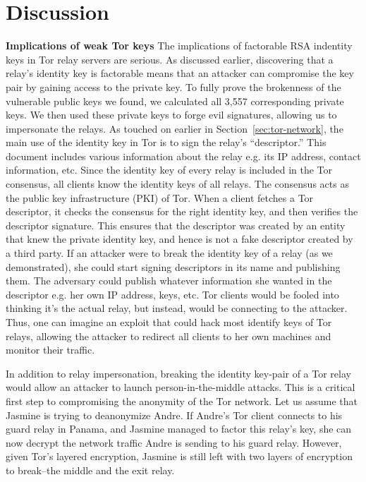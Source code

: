 \section{Discussion}
\label{sec:discussion}
\textbf{Implications of weak Tor keys}
The implications of factorable RSA indentity keys in Tor relay servers are serious. As discussed earlier, discovering that a relay's identity key is factorable means that an attacker can compromise the key pair by gaining access to the private key. To fully prove the brokenness of the vulnerable public keys we found, we calculated all 3,557 corresponding private keys. We then used these private keys to forge evil signatures, allowing us to impersonate the relays.
As touched on earlier in Section~\ref{sec:tor-network}, the main use of the identity key in Tor is to sign the relay's ``descriptor.'' This document includes various information about the relay e.g. its IP address, contact information, etc. Since the identity key of every relay is included in the Tor consensus, all clients know the identity keys of all relays. The consensus acts as the public key infrastructure (PKI) of Tor. When a client fetches a Tor descriptor, it checks the consensus for the right identity key, and then verifies the descriptor signature. This ensures that the descriptor was created by an entity that knew the private identity key, and hence is not a fake descriptor created by a third party. If an attacker were to break the identity key of a relay (as we demonstrated), she could start signing descriptors in its name and publishing them. The adversary could publish whatever information she wanted in the descriptor e.g. her own IP address, keys, etc. Tor clients would be fooled into thinking it's the actual relay, but instead, would be connecting to the attacker. Thus, one can imagine an exploit that could hack most identify keys of Tor relays, allowing the attacker to redirect all clients to her own machines and monitor their traffic.

In addition to relay impersonation, breaking the identity key-pair of a Tor relay would allow an attacker to launch person-in-the-middle attacks. This is a critical first step to compromising the anonymity of the Tor network. Let us assume that Jasmine is trying to deanonymize Andre. If Andre's Tor client connects to his guard relay in Panama,
and Jasmine managed to factor this relay's key, she can now decrypt the network traffic Andre is sending to his guard relay. However, given Tor's layered encryption, Jasmine is still left with two layers of encryption to break--the middle and the exit relay.

